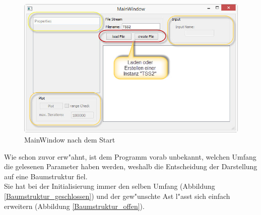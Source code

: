 \documentclass[11pt, a4paper, german]{article}
\theoremstyle{plain}
\begin{document}
	\begin{figure}[H]
		\centering
		\includegraphics[width=1\linewidth]{./Pictures/MainWindow_Start}
		\caption[Startwindow]{MainWindow nach dem Start}
		\label{MainWindow_Start}
	\end{figure}
	Wie schon zuvor erw"ahnt, ist dem Programm vorab unbekannt, welchen Umfang die gelesenen Parameter haben werden, weshalb die Entscheidung der Darstellung auf eine Baumstruktur fiel.\\
	Sie hat bei der Initialisierung immer den selben Umfang (Abbildung \ref{Baumstruktur_geschlossen}) und der gew"unschte Ast l"asst sich einfach erweitern (Abbildung \ref{Baumstruktur_offen}).
\end{document}
